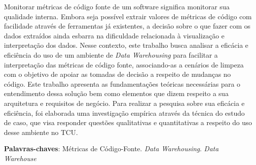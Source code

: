 \begin{resumo}

Monitorar métricas de código fonte de um software significa monitorar sua qualidade interna. Embora seja possível extrair valores de métricas de código com facilidade através de ferramentas já existentes, a decisão sobre o que fazer com os dados extraídos ainda esbarra na dificuldade relacionada à visualização e interpretação dos dados. Nesse contexto, este trabalho busca analisar a eficácia e eficiência do uso de um ambiente de \textit{Data Warehousing} para facilitar a interpretação das métricas de código fonte, associando-as a cenários de limpeza com o objetivo de apoiar as tomadas de decisão a respeito de mudanças no código. Este trabalho apresenta as fundamentações teóricas necessárias para o entendimento dessa solução bem como elementos que dizem respeito a sua arquitetura e requisitos de negócio. Para realizar a pesquisa sobre sua eficácia e eficiência, foi elaborada uma investigação empírica através da técnica do estudo de caso, que visa responder questões qualitativas e quantitativas a respeito do uso desse ambiente no TCU.

 \vspace{\onelineskip}
    
 \noindent
 \textbf{Palavras-chaves}: Métricas de Código-Fonte. \textit{Data Warehousing}. \textit{Data Warehouse}
\end{resumo}


